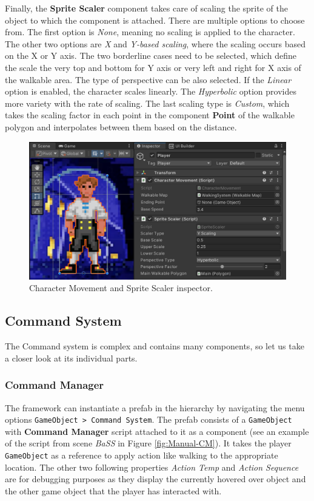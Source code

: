 Finally, the \textbf{Sprite Scaler} component takes care of scaling the sprite of the object to which the component is attached. There are multiple options to choose from. The first option is \textit{None}, meaning no scaling is applied to the character. The other two options are \textit{X }and \textit{Y-based scaling}, where the scaling occurs based on the X or Y axis. The two borderline cases need to be selected, which define the scale the very top and bottom for Y axis or very left and right for X axis of the walkable area. The type of perspective can be also selected. If the \textit{Linear} option is enabled, the character scales linearly. The \textit{Hyperbolic} option provides more variety with the rate of scaling. The last scaling type is \textit{Custom}, which takes the scaling factor in each point in the component \textbf{Point} of the walkable polygon and interpolates between them based on the distance.
\begin{figure}[H]
\centering
\includegraphics[width=0.8\linewidth]{img/User doc/character_movement.png}
\caption{Character Movement and Sprite Scaler inspector.}
\label{fig:Manual-ChM&SS}
\end{figure}

\subsection{Command System}
The Command system is complex and contains many components, so let us take a closer look at its individual parts.

\subsubsection{Command Manager}
The framework can instantiate a prefab in the hierarchy by navigating the menu options \verb|GameObject > Command System|. The prefab consists of a \verb|GameObject| with \textbf{Command Manager} script attached to it as a component (see an example of  the script from scene \textit{BaSS} in Figure \ref{fig:Manual-CM}). It takes the player \verb|GameObject| as a reference to apply action like walking to the appropriate location. The other two following properties \textit{Action Temp} and \textit{Action Sequence} are for debugging purposes as they display the currently hovered over object and the other game object that the player has interacted with.

